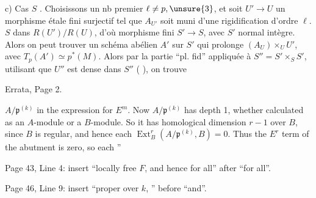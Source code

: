 c) Cas $S$ .  Choisissons un nb premier $\ell\ne p,\unsure{3}$, et soit $U'\to U$ un morphisme étale fini surjectif  tel que $A_{U'}$ soit muni d'une rigidification d'ordre $\ell$.
 $S$ dans $R(U')/R(U)$,  d'où morphisme fini  $S'\to S$,  avec $S'$ normal intègre.
Alors on peut trouver un schéma abélien $A'$ sur $S'$ qui prolonge $(A_U)\times_U U'$, avec $T_p(A')\simeq p^*(M)$.
Alors par la partie ``pl. fid'' appliquée à $S''=S'\times_S S'$, utilisant que $U''$ est dense dans $S''$ ( ), on trouve

Errata, Page 2.

$A/\mathfrak p^{(k)}$ in the expression for $E^m$. Now $A/\mathfrak p^{(k)}$ has depth 1, whether calculated as an $A$-module or a $B$-module. So it has homological dimension $r-1$ over $B$, since $B$ is regular, and hence each $\operatorname{Ext}_B^r(A/\mathfrak p^{(k)},B)=0$. Thus the $E^r$ term of the abutment is zero, so each ''

Page 43, Line 4: insert ``locally free $F$, and hence for all'' after ``for all''.

Page 46, Line 9: insert ``proper over $k$, '' before ``and''.

